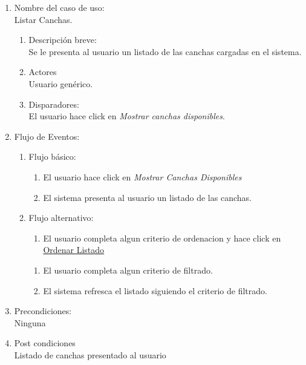 \documentclass[a4paper,11pt]{article}
\begin{document}
\begin{enumerate}

    \item Nombre del caso de uso: \\
    Listar Canchas.

    \begin{enumerate}
    \item Descripción breve: \\
        Se le presenta al usuario un listado de las canchas cargadas en el sistema.
    \item Actores \\
        Usuario genérico.
    \item Disparadores: \\
        El usuario hace click en \emph{Mostrar canchas disponibles}.
    \end{enumerate}

    \item Flujo de Eventos: \\

    \begin{enumerate}

        \item Flujo básico:\\          
	\begin{enumerate}
                    \item El usuario hace click en \emph{Mostrar Canchas Disponibles}
                    \item El sistema presenta al usuario un listado de las canchas.
        \end{enumerate}
        \item Flujo alternativo:\\
	\begin{enumerate}
                    \item El usuario completa algun criterio de ordenacion y hace click en \underline{Ordenar Listado}
        \end{enumerate}
	\begin{enumerate}
                    \item El usuario completa algun criterio de filtrado.
		\item El sistema refresca el listado siguiendo el criterio de filtrado.
        \end{enumerate}
    \end{enumerate}

    \item Precondiciones: \\
	Ninguna

    \item Post condiciones \\
        Listado de canchas presentado al usuario

\end{enumerate}
\end{document}
